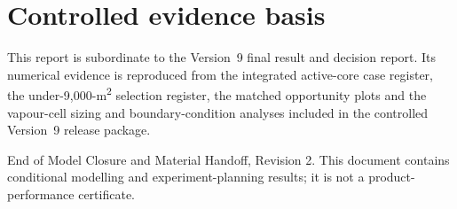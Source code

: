 \documentclass[10pt,a4paper]{article}
\newcommand{\sans}{\fontfamily{qhv}\selectfont}
\begin{document}
\section*{Controlled evidence basis}

This report is subordinate to the Version~9 final result and decision report.
Its numerical evidence is reproduced from the integrated active-core case
register, the under-9,000-m\textsuperscript{2} selection register, the matched
opportunity plots and the vapour-cell sizing and boundary-condition analyses
included in the controlled Version~9 release package.

\vfill
{\sans\scriptsize\color{Slate}End of Model Closure and Material Handoff, Revision 2. This document contains conditional modelling and experiment-planning results; it is not a product-performance certificate.}
\end{document}
